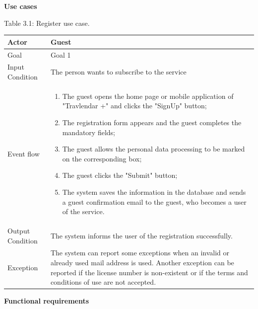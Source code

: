 \documentclass{article}
\begin{document}
	\newpage
	\noindent
	\textbf{Use cases} \\

	\begin{center}
		Table 3.1: Register use case.
		
		\bigskip
		\begin{tabular}{p{}|p{}}
	   		\hline
	    		Actor & Guest \\ \hline
	    		Goal & Goal 1 \\ \hline
	    		Input Condition & The person wants to subscribe to the service \\ \hline
	    		Event flow & 
			\begin{enumerate}
	  			\item The guest opens the home page or mobile application of "Travlendar +"  and clicks the "SignUp" button;
	  			\item The registration form appears and the guest completes the mandatory fields;
	  			\item The guest allows the personal data processing to be marked on the corresponding box;
	  			\item The guest clicks the "Submit" button;
	  			\item The system saves the information in the database and sends a guest confirmation email to the guest, who becomes a user of the service.
	 		 \end{enumerate} \\ \hline
	    		Output Condition & The system informs the user of the registration successfully. \\ \hline
	    		Exception & The system can report some exceptions when an invalid or already used mail address is used. Another exception can be reported if the license number is non-existent or if the terms and conditions of use are not accepted. \\ \hline
	    	\end{tabular}
	\end{center}
	
	\bigskip
	\noindent
	\textbf{Functional requirements} \\
	
\end{document}

